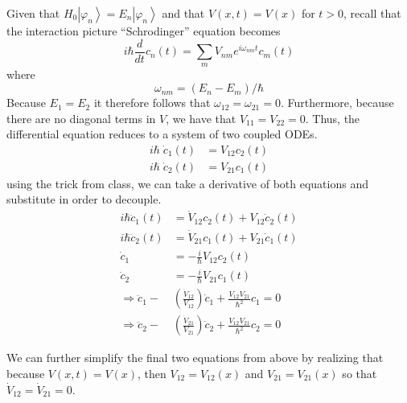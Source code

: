 \documentclass[a4paper, 11pt]{article}
\newcommand{\ket}[1]{\ensuremath{\left|#1\right\rangle}}
\newenvironment{solution}{%
	\begin{list}{}{%
			\setlength{\topsep}{0pt}%
			\setlength{\leftmargin}{0.5cm}%
			\setlength{\rightmargin}{0.5cm}%
			\setlength{\listparindent}{\parindent}%
			\setlength{\itemindent}{\parindent}%
			\setlength{\parsep}{\parskip}%
		}%
		\item[]}{\end{list}}
\begin{document}
\begin{enumerate}[leftmargin=0em, label=\textbf{\arabic*}]
    \begin{solution}
      Given that $H_0\ket{\varphi_n}=E_n\ket{\varphi_n}$ and that
      $V(x,t)=V(x)$ for $t>0$, recall that the interaction picture
      ``Schrodinger'' equation becomes
      \begin{equation}
        i\hbar\frac{d}{d t}c_n(t) = \sum_m V_{nm}e^{i\omega_{nm}t}c_m(t)
      \end{equation}
      where
      \begin{equation}
        \omega_{nm}= (E_n-E_m)/\hbar
      \end{equation}
      Because $E_1=E_2$ it therefore follows that $\omega_{12}=\omega_{21}=0$.
      Furthermore, because there are no diagonal terms in $V$, we have that
      $V_{11}=V_{22}=0$. Thus, the differential equation reduces to a system of
      two coupled ODEs.
      \begin{align}
        i\hbar\;\dot c_1(t) &= V_{12}c_2(t) \\
        i\hbar\;\dot c_2(t) &= V_{21}c_1(t)
      \end{align}
      using the trick from class, we can take a derivative of both equations and
      substitute in order to decouple.
      \begin{align}
        i\hbar \ddot c_1(t) &= \dot V_{12}c_2(t)+V_{12}\dot c_2(t) \\
        i\hbar \ddot c_2(t) &= \dot V_{21}c_1(t)+V_{21}\dot c_1(t) \\
        \dot c_1 &= -\frac{i}{\hbar}V_{12}c_2(t) \\
        \dot c_2 &= -\frac{i}{\hbar}V_{21}c_1(t) \\
        \Rightarrow \ddot c_1 - &\left( \frac{\dot V_{12}}{V_{12}} \right)\dot c_1 + \frac{V_{12}V_{21}}{\hbar^2}c_1 = 0 \\
        \Rightarrow \ddot c_2 - &\left( \frac{\dot V_{21}}{V_{21}} \right)\dot c_2 + \frac{V_{12}V_{21}}{\hbar^2}c_2 = 0 
      \end{align}
      
      We can further simplify the final two equations from above by realizing
      that because $V(x,t)=V(x)$, then $V_{12}=V_{12}(x)$ and $V_{21}=
      V_{21}(x)$ so that $\dot V_{12}=\dot V_{21} = 0$. \\


\end{solution}
\end{enumerate}
\end{document}
